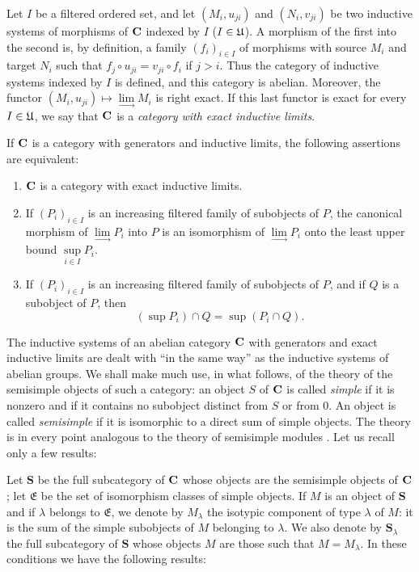 Let $I$ be a filtered ordered set, and let $(M_i, u_{ji})$ and $(N_i, v_{ji})$
be two inductive systems of morphisms of $\mathbf{C}$ indexed by $I$
($I\in\mathfrak{U}$). A morphism of the first into the second is, by definition, a
family $(f_i)_{i\in I}$ of morphisms with source $M_i$ and target $N_i$ such
that $f_j\circ u_{ji} = v_{ji}\circ f_i$ if $j > i$. Thus the category of
inductive systems indexed by $I$ is defined, and this category is abelian.
Moreover, the functor $(M_i,u_{ji})\mapsto \lim\limits_{\to} M_i$ is right
exact. If this last functor is exact for every $I\in\mathfrak{U}$, we say that $\mathbf{C}$
is a \emph{category with exact inductive limits}.

\begin{proposition}\label{prop:exact-inductive-limits}
If $\mathbf{C}$ is a category with generators and inductive limits, the following
assertions are equivalent:
\begin{enumerate}[label=\alph*.]
\item $\mathbf{C}$ is a category with exact inductive limits.

\item If $(P_i)_{i\in I}$ is an increasing filtered family of subobjects of
      $P$, the canonical morphism of $\lim\limits_{\to} P_i$ into $P$ is an
      isomorphism of $\lim\limits_{\to} P_i$ onto the least upper bound
      $\sup\limits_{i\in I} P_i$.

\item If $(P_i)_{i\in I}$ is an increasing filtered family of subobjects of
      $P$, and if $Q$ is a subobject of $P$, then
      \[
        (\sup P_i) \cap Q = \sup(P_i \cap Q).
      \]
\end{enumerate}
\end{proposition}

The inductive systems of an abelian category $\mathbf{C}$ with generators and exact
inductive limits are dealt with ``in the same way'' as the inductive systems
of abelian groups. We shall make much use, in what follows, of the theory of
the semisimple objects of such a category: an object $S$ of $\mathbf{C}$ is called
\emph{simple} if it is nonzero and if it contains no subobject distinct from
$S$ or from $0$. An object is called \emph{semisimple} if it is isomorphic to
a direct sum of simple objects. The theory is in every point analogous to
the theory of semisimple modules \cite{bourbaki-algebre}. Let us recall only a few results:

Let $\mathbf{S}$ be the full subcategory of $\mathbf{C}$ whose objects are the
semisimple objects of $\mathbf{C}$; let $\mathfrak{E}$ be the set of isomorphism
classes of simple objects. If $M$ is an object of $\mathbf{S}$ and if
$\lambda$ belongs to $\mathfrak{E}$, we denote by $M_\lambda$ the isotypic
component of type $\lambda$ of $M$: it is the sum of the simple subobjects of
$M$ belonging to $\lambda$. We also denote by $\mathbf{S}_\lambda$ the full
subcategory of $\mathbf{S}$ whose objects $M$ are those such that
$M = M_\lambda$. In these conditions we have the following results:

